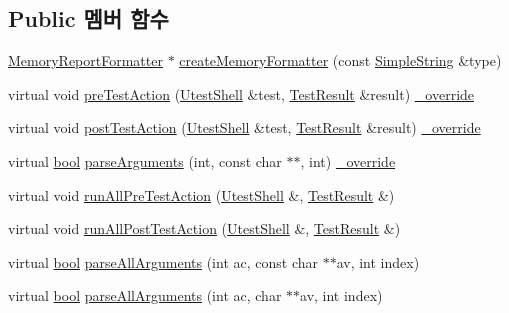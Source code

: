 \subsection*{Public 멤버 함수}
\begin{DoxyCompactItemize}
\item 
\hyperlink{class_memory_report_formatter}{Memory\+Report\+Formatter} $\ast$ \hyperlink{class_memory_reporter_plugin_under_test_af544ea81b03481a778ddd5bdd56b11d9}{create\+Memory\+Formatter} (const \hyperlink{class_simple_string}{Simple\+String} \&type)
\item 
virtual void \hyperlink{class_memory_reporter_plugin_af405f9e83b5fbe382893b8dc07a8052c}{pre\+Test\+Action} (\hyperlink{class_utest_shell}{Utest\+Shell} \&test, \hyperlink{class_test_result}{Test\+Result} \&result) \hyperlink{_cpp_u_test_config_8h_a049bea15dd750e15869863c94c1efc3b}{\+\_\+override}
\item 
virtual void \hyperlink{class_memory_reporter_plugin_a488f8809f966fc52513ee74afa87cda3}{post\+Test\+Action} (\hyperlink{class_utest_shell}{Utest\+Shell} \&test, \hyperlink{class_test_result}{Test\+Result} \&result) \hyperlink{_cpp_u_test_config_8h_a049bea15dd750e15869863c94c1efc3b}{\+\_\+override}
\item 
virtual \hyperlink{avb__gptp_8h_af6a258d8f3ee5206d682d799316314b1}{bool} \hyperlink{class_memory_reporter_plugin_a52f577dfe7627722cfcbd0fca54e86e0}{parse\+Arguments} (int, const char $\ast$$\ast$, int) \hyperlink{_cpp_u_test_config_8h_a049bea15dd750e15869863c94c1efc3b}{\+\_\+override}
\item 
virtual void \hyperlink{class_test_plugin_aa3524b10b0f1613104fa75f1c1a72cf6}{run\+All\+Pre\+Test\+Action} (\hyperlink{class_utest_shell}{Utest\+Shell} \&, \hyperlink{class_test_result}{Test\+Result} \&)
\item 
virtual void \hyperlink{class_test_plugin_ac6e93f69beb5b43b8cedf17a77ccc6b1}{run\+All\+Post\+Test\+Action} (\hyperlink{class_utest_shell}{Utest\+Shell} \&, \hyperlink{class_test_result}{Test\+Result} \&)
\item 
virtual \hyperlink{avb__gptp_8h_af6a258d8f3ee5206d682d799316314b1}{bool} \hyperlink{class_test_plugin_acfa2bcea2c98a16cb7d2a8f177bb84b9}{parse\+All\+Arguments} (int ac, const char $\ast$$\ast$av, int index)
\item 
virtual \hyperlink{avb__gptp_8h_af6a258d8f3ee5206d682d799316314b1}{bool} \hyperlink{class_test_plugin_a6d3fb0408bb544bd7ec5ba9300328a5e}{parse\+All\+Arguments} (int ac, char $\ast$$\ast$av, int index)
\item 
$$
\end{DoxyCompactItemize}
